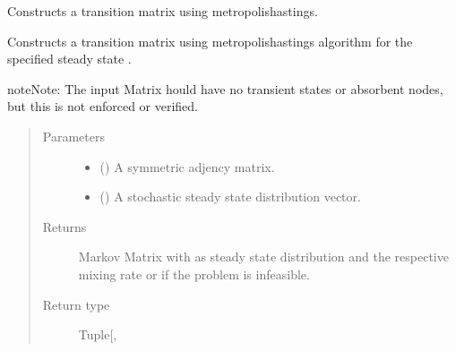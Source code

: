 \documentclass[letterpaper,10pt,english]{sphinxmanual}
\begin{document}

\begin{fulllineitems}
\label{\detokenize{app.domain.helpers:app.domain.helpers.matrices.new_mh_transition_matrix}}
Constructs a transition matrix using metropolis\sphinxhyphen{}hastings.

Constructs a transition matrix using metropolis\sphinxhyphen{}hastings algorithm  for
the specified steady state .

\begin{sphinxadmonition}{note}{Note:}
The input Matrix hould have no transient states or absorbent nodes,
but this is not enforced or verified.
\end{sphinxadmonition}
\begin{quote}\begin{description}
\item[{Parameters}] \leavevmode\begin{itemize}
\item {} 
 () \textendash{} A symmetric adjency matrix.

\item {} 
 () \textendash{} A stochastic steady state distribution vector.

\end{itemize}

\item[{Returns}] \leavevmode
Markov Matrix with  as steady state distribution and the
respective mixing rate or  if the problem is
infeasible.

\item[{Return type}] \leavevmode
Tuple{[}, \sphinxhref{https://docs.python.org/3.7/library/functions.html\#float}{float}{]}

\end{description}\end{quote}

\end{fulllineitems}
\end{document}
